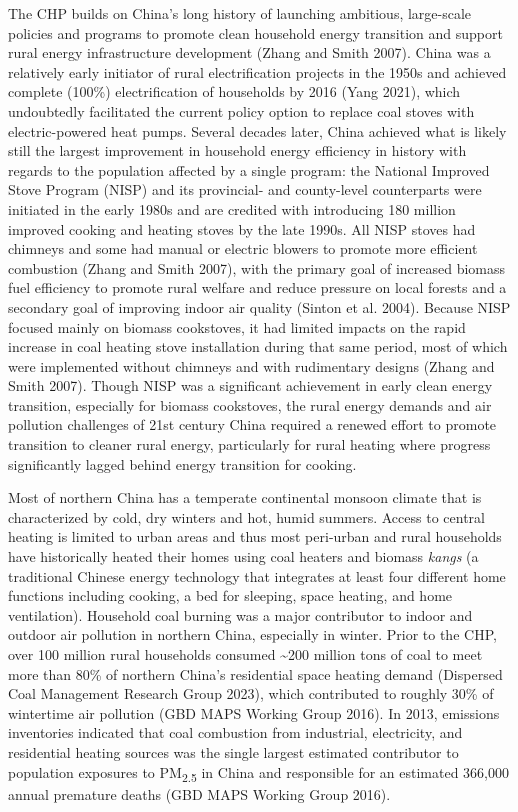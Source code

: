 \documentclass[
  letterpaper,
  DIV=11,
  numbers=noendperiod]{scrartcl}
\begin{document}
The  CHP builds on China's long history of launching
ambitious, large-scale policies and programs to promote clean household
energy transition and support rural energy infrastructure development
(Zhang and Smith 2007). China was a relatively early initiator of rural
electrification projects in the 1950s and achieved complete (100\%)
electrification of households by 2016 (Yang 2021), which undoubtedly
facilitated the current policy option to replace coal stoves with
electric-powered heat pumps. Several decades later, China achieved what
is likely still the largest improvement in household energy efficiency
in history with regards to the population affected by a single program:
the National Improved Stove Program (NISP) and its provincial- and
county-level counterparts were initiated in the early 1980s and are
credited with introducing 180 million improved cooking and heating
stoves by the late 1990s. All NISP stoves had chimneys and some had
manual or electric blowers to promote more efficient combustion (Zhang
and Smith 2007), with the primary goal of increased biomass fuel
efficiency to promote rural welfare and reduce pressure on local forests
and a secondary goal of improving indoor air quality (Sinton et al.
2004). Because NISP focused mainly on biomass cookstoves, it had limited
impacts on the rapid increase in coal heating stove installation during
that same period, most of which were implemented without chimneys and
with rudimentary designs (Zhang and Smith 2007). Though NISP was a
significant achievement in early clean energy transition, especially for
biomass cookstoves, the rural energy demands and air pollution
challenges of 21st century China required a renewed effort to promote
transition to cleaner rural energy, particularly for rural heating where
progress significantly lagged behind energy transition for cooking.

Most of northern China has a temperate continental monsoon climate that
is characterized by cold, dry winters and hot, humid summers. Access to
central heating is limited to urban areas and thus most peri-urban and
rural households have historically heated their homes using coal heaters
and biomass \emph{kangs} (a traditional Chinese energy technology that
integrates at least four different home functions including cooking, a
bed for sleeping, space heating, and home ventilation). Household coal
burning was a major contributor to indoor and outdoor air pollution in
northern China, especially in winter. Prior to the CHP, over 100 million
rural households consumed \textasciitilde200 million tons of coal to
meet more than 80\% of northern China's residential space heating demand
(Dispersed Coal Management Research Group 2023), which contributed to
roughly 30\% of wintertime air pollution (GBD MAPS Working Group 2016).
In 2013, emissions inventories indicated that coal combustion from
industrial, electricity, and residential heating sources was the single
largest estimated contributor to population exposures to
PM\textsubscript{2.5} in China and responsible for an estimated 366,000
annual premature deaths (GBD MAPS Working Group 2016).
\end{document}
